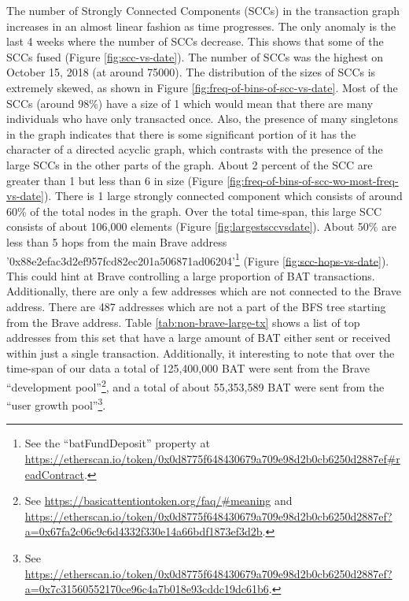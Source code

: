 \documentclass[sigconf]{acmart}
\begin{document}
The number of Strongly Connected Components (SCCs) in the transaction
graph increases in an almost linear fashion as time progresses.
The only anomaly is the last 4 weeks where the number of SCCs decrease.
This shows that some of the SCCs fused (Figure \ref{fig:scc-vs-date}). The number of SCCs was the highest on October 15, 2018 (at around 75000).
The distribution of the sizes of SCCs is extremely skewed,
as shown in Figure \ref{fig:freq-of-bins-of-scc-vs-date}.
Most of the SCCs (around 98\%) have a size of 1
which would mean that there are many individuals who have
only transacted once.
Also, the presence of many singletons in the graph
indicates that there is some significant portion of it
has the character of a directed acyclic graph, which
contrasts with the presence of the large SCCs in the other parts of the graph.
About 2 percent of the SCC are greater than 1 but less than 6 in size (Figure \ref{fig:freq-of-bins-of-scc-wo-most-freq-vs-date}).
There is 1 large strongly connected component which consists of around 60\% of the total nodes in the graph.
Over the total time-span, this large SCC consists of about 106,000 elements (Figure \ref{fig:largestsccvsdate}).
About 50\% are less than 5 hops from the main Brave address
'0x88e2efac3d2ef957fcd82ec201a506871ad06204'\footnote{
See the ``batFundDeposit'' property at \url{https://etherscan.io/token/0x0d8775f648430679a709e98d2b0cb6250d2887ef\#readContract}.} (Figure \ref{fig:scc-hops-vs-date}).
This could hint at Brave controlling a large proportion of BAT transactions.
Additionally, there are only a few addresses which are not connected to the Brave address.
There are 487 addresses which are not a part of the BFS tree starting from the Brave address. Table \ref{tab:non-brave-large-tx} shows a list of top addresses 
from this set that have a large amount of BAT either sent or received within just a single transaction.
Additionally, it interesting to note that over the time-span of our data
a total of 125,400,000 BAT were sent from the Brave
``development pool''\footnote{See \url{https://basicattentiontoken.org/faq/\#meaning} and \url{https://etherscan.io/token/0x0d8775f648430679a709e98d2b0cb6250d2887ef?a=0x67fa2c06c9c6d4332f330e14a66bdf1873ef3d2b}.},
and a total of about 55,353,589 BAT were sent from the ``user growth pool''\footnote{See \url{https://etherscan.io/token/0x0d8775f648430679a709e98d2b0cb6250d2887ef?a=0x7c31560552170ce96c4a7b018e93cddc19dc61b6}.}.
\end{document}
